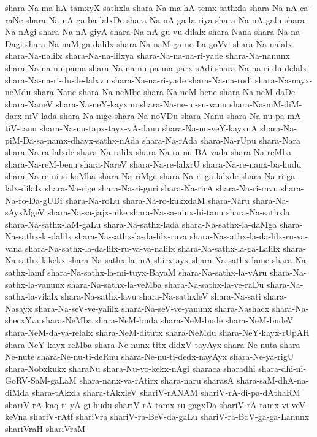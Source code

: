 {shara-Na-ma-hA-tamxyX-sathxla
shara-Na-ma-hA-temx-sathxla
shara-Na-nA-ca-raNe
shara-Na-nA-ga-ba-lalxDe
shara-Na-nA-ga-la-riya
shara-Na-nA-galu
shara-Na-nAgi
shara-Na-nA-giyA
shara-Na-nA-gu-vu-dilalx
shara-Nana
shara-Na-na-Dagi
shara-Na-naM-ga-dalilx
shara-Na-naM-ga-no-La-goVvi
shara-Na-nalalx
shara-Na-nalilx
shara-Na-na-lilxya
shara-Na-na-na-ri-yade
shara-Na-nanunx
shara-Na-na-nu-pama
shara-Na-na-nu-pa-ma-parx-sAdi
shara-Na-na-ri-du-delalx
shara-Na-na-ri-du-de-lalxvu
shara-Na-na-ri-yade
shara-Na-na-rodi
shara-Na-nayx-neMdu
shara-Nane
shara-Na-neMbe
shara-Na-neM-bene
shara-Na-neM-daDe
shara-NaneV
shara-Na-neY-kayxnu
shara-Na-ne-ni-su-vanu
shara-Na-niM-diM-darx-niV-lada
shara-Na-nige
shara-Na-noVDu
shara-Nanu
shara-Na-nu-pa-mA-tiV-tanu
shara-Na-nu-tapx-tayx-vA-danu
shara-Na-nu-veY-kayxnA
shara-Na-piM-Da-sa-namx-dhayx-sathx-nAda
shara-Na-rAda
shara-Na-rUpu
shara-Nara
shara-Na-ra-lalxde
shara-Na-ralilx
shara-Na-ra-nu-BA-vada
shara-Na-reMba
shara-Na-reM-benu
shara-NareV
shara-Na-re-lalxrU
shara-Na-re-nanx-ba-hudu
shara-Na-re-ni-si-koMba
shara-Na-riMge
shara-Na-ri-ga-lalxde
shara-Na-ri-ga-lalx-dilalx
shara-Na-rige
shara-Na-ri-guri
shara-Na-rirA
shara-Na-ri-ravu
shara-Na-ro-Da-gUDi
shara-Na-roLu
shara-Na-ro-kukxdaM
shara-Naru
shara-Na-sAyxMgeV
shara-Na-sa-jajx-nike
shara-Na-sa-ninx-hi-tanu
shara-Na-sathxla
shara-Na-sathx-laM-gaLu
shara-Na-sathx-lada
shara-Na-sathx-la-daMga
shara-Na-sathx-la-dalilx
shara-Na-sathx-la-da-lilx-ruva
shara-Na-sathx-la-da-lilx-ru-va-vana
shara-Na-sathx-la-da-lilx-ru-va-va-nalilx
shara-Na-sathx-la-ga-Lalilx
shara-Na-sathx-lakekx
shara-Na-sathx-la-mA-shirxtayx
shara-Na-sathx-lame
shara-Na-sathx-lamf
shara-Na-sathx-la-mi-tuyx-BayaM
shara-Na-sathx-la-vAru
shara-Na-sathx-la-vanunx
shara-Na-sathx-la-veMba
shara-Na-sathx-la-ve-raDu
shara-Na-sathx-la-vilalx
shara-Na-sathx-lavu
shara-Na-sathxleV
shara-Na-sati
shara-Nasayx
shara-Na-seV-ve-yalilx
shara-Na-seV-ve-yanunx
shara-Nashacx
shara-Na-shecxYva
shara-NeMba
shara-NeM-buda
shara-NeM-bude
shara-NeM-budeV
shara-NeM-da-va-relalx
shara-NeM-ditutx
shara-NeMdu
shara-NeY-kayx-rUpAH
shara-NeY-kayx-reMba
shara-Ne-nunx-titx-didxV-tayAyx
shara-Ne-nuta
shara-Ne-nute
shara-Ne-nu-ti-deRnu
shara-Ne-nu-ti-dedx-nayAyx
shara-Ne-ya-rigU
shara-Nobxkukx
sharaNu
shara-Nu-vo-kekx-nAgi
sharaca
sharadhi
shara-dhi-ni-GoRV-SaM-gaLaM
shara-nanx-va-rAtirx
shara-naru
sharasA
shara-saM-dhA-na-diMda
shara-tAkxla
shara-tAkxleV
shariV-rANAM
shariV-rA-di-pa-dAthaRM
shariV-rA-kaq-ti-yA-gi-hudu
shariV-rA-tamx-ru-gagxDa
shariV-rA-tamx-vi-veV-keVna
shariV-rAtf
shariVra
shariV-ra-BeV-da-gaLu
shariV-ra-BoV-ga-ga-Lanunx
shariVraH
shariVraM
}

